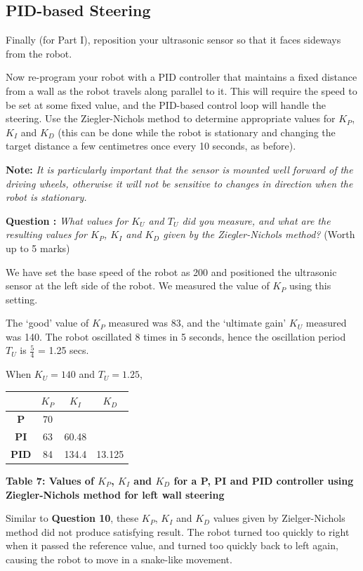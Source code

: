 \documentclass[hidelinks,a4paper,11pt]{article}
\newcounter{question}
\newcommand\myq{\refstepcounter{question}\thequestion}
\begin{document}
\subsection{PID-based Steering}

Finally (for Part I), reposition your ultrasonic sensor so that it faces sideways from the robot.

Now re-program your robot with a PID controller that maintains a fixed distance from a wall as the
robot travels along parallel to it.  This will require the speed to be set at some fixed value, and
the PID-based control loop will handle the steering.  Use the Ziegler-Nichols method to determine
appropriate values for $K_P$, $K_I$ and $K_D$ (this can be done while the robot is stationary and
changing the target distance a few centimetres once every 10 seconds, as before).

{\bfseries Note:}  \emph{It is particularly important that the sensor is mounted well forward of the
driving wheels, otherwise it will not be sensitive to changes in direction when the robot is
stationary.}

{\bfseries Question \myq:}  \emph{What values for $K_U$ and $T_U$ did you measure, and what are the
resulting values for $K_P$, $K_I$ and $K_D$  given by the Ziegler-Nichols method?} (Worth up to 5
marks)\\
\begin{mdframed}
We have set the base speed of the robot as 200 and positioned the ultrasonic sensor at the left side
of the robot. We measured the value of $K_P$ using this setting.

The `good' value of $K_P$ measured was 83, and the `ultimate gain' $K_U$ measured was 140. The robot
oscillated 8 times in 5 seconds, hence the oscillation period $T_U$ is \( \frac{5}{4} \) = 1.25
secs.

When $K_U = 140$ and $T_U = 1.25$,
\begin{center}
	\begin{tabular}{ | c | c | c | c | } \hline
		 & \bf{$K_P$} & \bf{$K_I$} & \bf{$K_D$} \\ \hline
		\bf{P} & 70 &  &  \\ \hline
		\bf{PI} & 63 & 60.48 &  \\ \hline
		\bf{PID} & 84 & 134.4 & 13.125 \\ \hline
	\end{tabular}
\end{center}
\vspace{3mm}
\begin{center}
\textbf{Table 7: Values of $K_P$, $K_I$ and $K_D$ for a P, PI and PID controller using Ziegler-Nichols method for left wall steering}
\end{center}

Similar to \textbf{Question 10}, these $K_P$, $K_I$ and $K_D$ values given by Zielger-Nichols method
did not produce satisfying result. The robot turned too quickly to right when it passed the
reference value, and turned too quickly back to left again, causing the robot to move in a
snake-like movement.
\end{mdframed}
\vspace*{\baselineskip}
\end{document}
